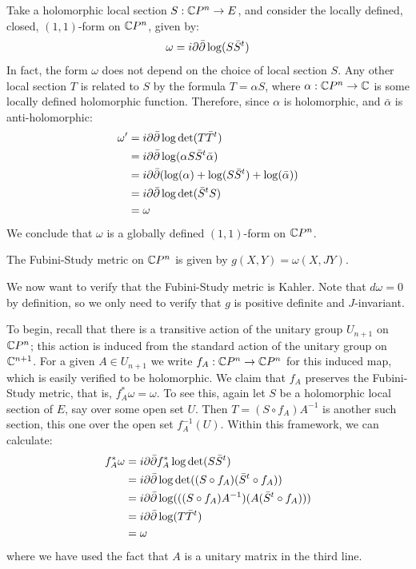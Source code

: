 Take a holomorphic local section $S: \mathbb{C}P^n \rightarrow E$, and consider the locally defined, closed, $(1,1)$-form on $\mathbb{C}P^n$, given by:
%
$$ \omega = i \partial \bar{\partial} \log ( S \bar{S}^{t} ) $$
%
In fact, the form $\omega$ does not depend on the choice of local section $S$. Any other local section $T$ is related to $S$ by the formula $T = \alpha S $, where $\alpha: \mathbb{C}P^n \rightarrow \mathbb{C} $ is some locally defined holomorphic function.  Therefore, since $\alpha$ is holomorphic, and $\bar{\alpha}$ is anti-holomorphic:
%
\begin{align*} \omega' &= i \partial \bar{\partial} \log \det ( T \bar{T}^{t} ) \\
&= i \partial \bar{\partial} \log ( \alpha S \bar{S}^t \bar{\alpha} ) \\
&= i \partial \bar{\partial}( \log (\alpha) + \log( S \bar{S}^t ) + \log( \bar{\alpha} ) ) \\
&= i \partial \bar{\partial} \log \det ( \bar{S}^{t} S ) \\
&= \omega
\end{align*}
%
We conclude that $\omega$ is a globally defined $(1,1)$-form on $\mathbb{C}P^n$.
%
\begin{definition} The Fubini-Study metric on $\mathbb{C}P^n$ is given by $g(X,Y) = \omega(X,JY)$.
\end{definition}
%
We now want to verify that the Fubini-Study metric is Kahler.  Note that $d \omega = 0$ by definition, so we only need to verify that $g$ is positive definite and $J$-invariant.

To begin, recall that there is a transitive action of the unitary group $U_{n+1}$ on $\mathbb{C}P^n$; this action is induced from the standard action of the unitary group on $\mathbb{C}^{n+1}$.  For a given $A \in U_{n+1}$ we write $f_{A}: \mathbb{C}P^n \rightarrow \mathbb{C}P^n$ for this induced map, which is easily verified to be holomorphic.  We claim that $f_A$ preserves the Fubini-Study metric, that is, $f^{\ast}_A \omega = \omega$.  To see this, again let $S$ be a holomorphic local section of $E$, say over some open set $U$.  Then $T = ( S \circ f_A )A^{-1} $ is another such section, this one over the open set $f_A^{-1}(U)$.  Within this framework, we can calculate:
%
\begin{align*} f^{\ast}_A \omega &= i \partial \bar{\partial} f^{\ast}_A \log \det ( S \bar{S}^t ) \\
&= i \partial \bar{\partial} \log \det ( ( S \circ f_A ) ( \bar{S}^t \circ f_A ) ) \\
&= i \partial \bar{\partial} \log ( ( ( S \circ f_A ) A^{-1} ) ( A (\bar{S}^t \circ f_A ) ) )\\
&= i \partial \bar{\partial} \log ( T \bar{T}^t ) \\
&= \omega 
\end{align*}
%
where we have used the fact that $A$ is a unitary matrix in the third line.

